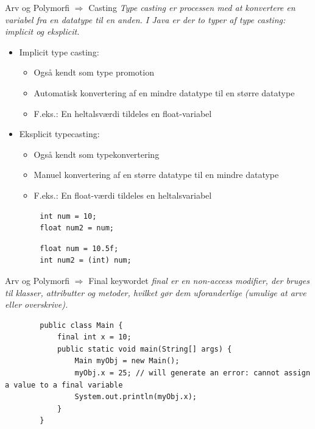 \documentclass[10pt,aspectratio=1610]{beamer}
\begin{document}
\begin{frame}[fragile]{Arv og Polymorfi $\Rightarrow$ Casting}
    \textit{Type casting er processen med at konvertere en variabel fra en datatype til en anden. I Java er der to typer af type casting: implicit og eksplicit.}

    \begin{itemize}
        \item Implicit type casting: 
        \begin{itemize}
            \item Også kendt som type promotion
            \item Automatisk konvertering af en mindre datatype til en større datatype
            \item F.eks.: En heltalsværdi tildeles en float-variabel
        \end{itemize}
        \item Eksplicit typecasting: 
        \begin{itemize}
            \item Også kendt som typekonvertering
            \item Manuel konvertering af en større datatype til en mindre datatype
            \item F.eks.: En float-værdi tildeles en heltalsvariabel
        \end{itemize}
    \end{itemize}
    \begin{lstlisting}
        int num = 10;
        float num2 = num;
    \end{lstlisting}
    \begin{lstlisting}
        float num = 10.5f;
        int num2 = (int) num;
    \end{lstlisting}
\end{frame}


\begin{frame}[fragile]{Arv og Polymorfi $\Rightarrow$ Final keywordet}
    \textit{ final er en non-access modifier, der bruges til klasser, attributter og metoder, hvilket gør dem uforanderlige (umulige at arve eller overskrive).}
    \begin{lstlisting}
        public class Main {
            final int x = 10;
            public static void main(String[] args) {
                Main myObj = new Main();
                myObj.x = 25; // will generate an error: cannot assign a value to a final variable
                System.out.println(myObj.x);
            }
        }
    \end{lstlisting}
\end{frame}
\end{document}
